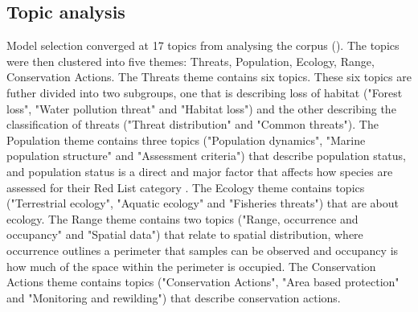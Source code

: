 \subsection{Topic analysis}


Model selection converged at 17 topics from analysing the corpus (). The topics were then clustered into five themes: Threats, Population, Ecology, Range, Conservation Actions. The Threats theme contains six topics. These six topics are futher divided into two subgroups, one that is describing loss of habitat ("Forest loss", "Water pollution threat" and "Habitat loss") and the other describing the classification of threats ("Threat distribution" and "Common threats"). The Population theme contains three topics ("Population dynamics", "Marine population structure" and "Assessment criteria") that describe population status, and population status is a direct and major factor that affects how species are assessed for their Red List category \parencite{iucn2012}. The Ecology theme contains topics ("Terrestrial ecology", "Aquatic ecology" and "Fisheries threats") that are about ecology. The Range theme contains two topics ("Range, occurrence and occupancy" and "Spatial data") that relate to spatial distribution, where occurrence outlines a perimeter that samples can be observed and occupancy is how much of the space within the perimeter is occupied. The Conservation Actions theme contains topics ("Conservation Actions", "Area based protection" and "Monitoring and rewilding") that describe conservation actions.

